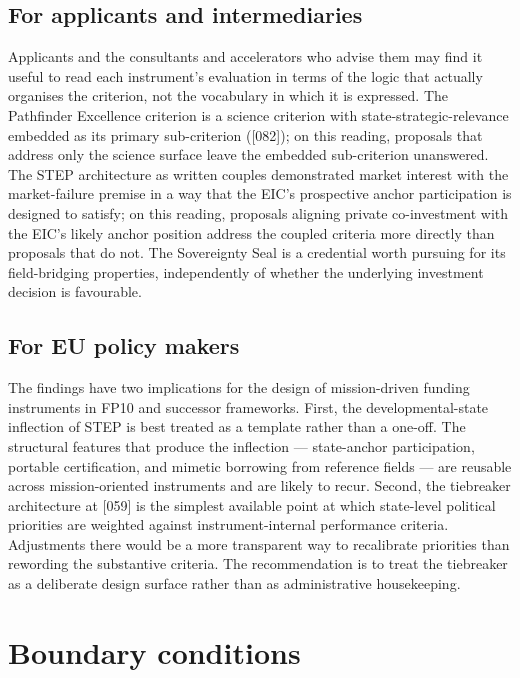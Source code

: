 \subsection{For applicants and intermediaries}
\label{sec:disc-prog-app}

Applicants and the consultants and accelerators who advise them may
find it useful to read each instrument's evaluation in terms of the
logic that actually organises the criterion, not the vocabulary in
which it is expressed. The Pathfinder Excellence criterion is a
science criterion with state-strategic-relevance embedded as its
primary sub-criterion ([082]); on this reading, proposals that address
only the science surface leave the embedded sub-criterion unanswered.
The STEP architecture as written couples demonstrated market interest
with the market-failure premise in a way that the EIC's prospective
anchor participation is designed to satisfy; on this reading,
proposals aligning private co-investment with the EIC's likely anchor
position address the coupled criteria more directly than proposals
that do not. The Sovereignty Seal is a credential worth
pursuing for its field-bridging properties, independently of whether
the underlying investment decision is favourable.

\subsection{For EU policy makers}
\label{sec:disc-prog-eu}

The findings have two implications for the design of mission-driven
funding instruments in FP10 and successor frameworks. First, the
developmental-state inflection of STEP is best treated as a template
rather than a one-off. The structural features that produce the
inflection --- state-anchor participation, portable certification, and
mimetic borrowing from reference fields --- are reusable across
mission-oriented instruments and are likely to recur. Second, the
tiebreaker architecture at [059] is the simplest available point at
which state-level political priorities are weighted against
instrument-internal performance criteria. Adjustments there would be
a more transparent way to recalibrate priorities than rewording the
substantive criteria. The recommendation is to treat the tiebreaker as
a deliberate design surface rather than as administrative
housekeeping.

\section{Boundary conditions}
\label{sec:disc-boundary}

